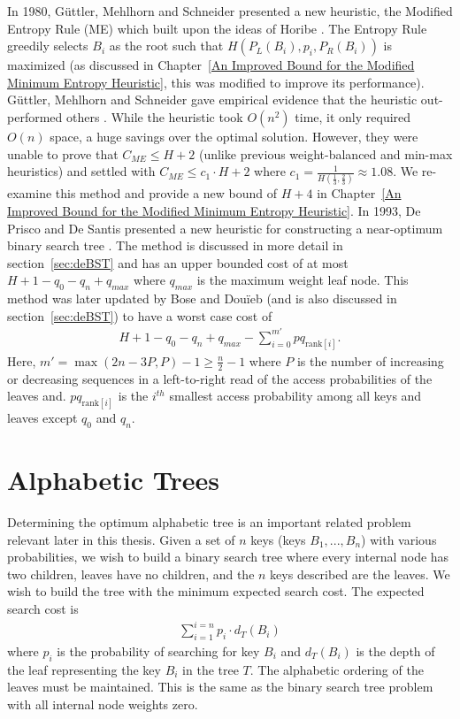 \documentclass[letterpaper,12pt,titlepage,oneside,final]{book}
\theoremstyle{plain}
\begin{document}
  In 1980, G{\"u}ttler, Mehlhorn and Schneider presented a new heuristic, the Modified Entropy Rule (ME) \cite{guttler1980binary} which built upon the ideas of Horibe \cite{horibe1977improved}. The Entropy Rule greedily selects $B_i$ as the root such that $H(P_L(B_i), p_i, P_R(B_i))$ is maximized (as discussed in Chapter~\ref{An Improved Bound for the Modified Minimum Entropy Heuristic}, this was modified to improve its performance). G{\"u}ttler, Mehlhorn and Schneider gave empirical evidence that the heuristic out-performed others \cite{guttler1980binary}. While the heuristic took $O(n^2)$ time, it only required $O(n)$ space, a huge savings over the optimal solution. However, they were unable to prove that $C_{ME} \leq H+2$ (unlike previous weight-balanced and min-max heuristics) and settled with $C_{ME} \leq c_1\cdot H+2$ where $c_1=\frac{1}{H(\frac{1}{3}, \frac{2}{3})} \approx 1.08$. We re-examine this method and provide a new bound of $H+4$ in Chapter~\ref{An Improved Bound for the Modified Minimum Entropy Heuristic}. In 1993, De Prisco and De Santis presented a new heuristic for constructing a near-optimum binary search tree \cite{de1993binary}. The method is discussed in more detail in section~\ref{sec:deBST} and has an upper bounded cost of at most $H+1-q_0-q_n+q_{max}$ where $q_{max}$ is the maximum weight leaf node. This method was later updated by Bose and Dou\"{i}eb (and is also discussed in section~\ref{sec:deBST}) to have a worst case cost of 
\begin{align*}
H + 1 - q_0 - q_n + q_{max} - \sum_{i=0}^{m'} pq_{\text{rank}[i]}.
\end{align*}
Here, $m'=\max({2n-3P,P})-1 \geq \frac{n}{2} - 1$ where $P$ is the number of increasing or decreasing sequences in a left-to-right read of the access probabilities of the leaves and.  $pq_{\text{rank}[i]}$ is the $i^{th}$ smallest access probability among all keys and leaves except $q_0$ and $q_n$.

 
\section{Alphabetic Trees}

Determining the optimum alphabetic tree is an important related problem relevant later in this thesis. Given a set of $n$ keys (keys $B_1, ..., B_n$) with various probabilities, we wish to build a binary search tree where every internal node has two children, leaves have no children, and the $n$ keys described are the leaves. We wish to build the tree with the minimum expected search cost. The expected search cost is
\begin{align*}
\sum_{i=1}^{i=n} p_i \cdot d_T(B_i)
\end{align*}
where $p_i$ is the probability of searching for key $B_i$ and $d_T(B_i)$ is the depth of the leaf representing the key $B_i$ in the tree $T$. The alphabetic ordering of the leaves must be maintained. This is the same as the binary search tree problem with all internal node weights zero.
\end{document}
